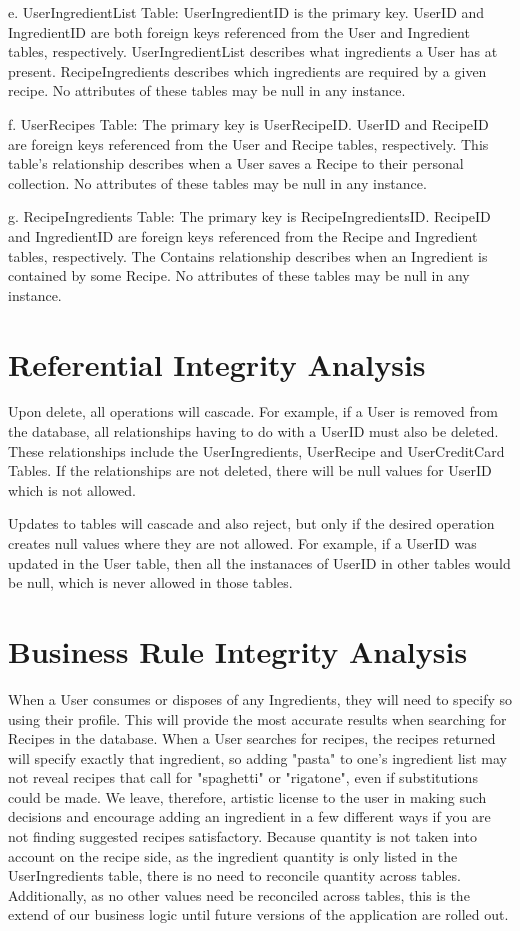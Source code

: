 \documentclass{article}
\begin{document}
e.	UserIngredientList Table: UserIngredientID is the primary key. UserID and IngredientID are both foreign keys referenced from the User and Ingredient tables, respectively.  UserIngredientList describes what ingredients a User has at present. RecipeIngredients describes which ingredients are required by a given recipe. No attributes of these tables may be null in any instance.

f.	UserRecipes Table: The primary key is UserRecipeID. UserID and RecipeID are foreign keys referenced from the User and Recipe tables, respectively. This table's relationship describes when a User saves a Recipe to their personal collection. No attributes of these tables may be null in any instance.
 
g.	RecipeIngredients Table:  The primary key is RecipeIngredientsID. RecipeID and IngredientID are foreign keys referenced from the Recipe and Ingredient tables, respectively. The Contains relationship describes when an Ingredient is contained by some Recipe. No attributes of these tables may be null in any instance.

\section{Referential Integrity Analysis}
Upon delete, all operations will cascade. For example, if a User is removed from the database, all relationships having to do with a UserID must also be deleted. These relationships include the UserIngredients, UserRecipe and UserCreditCard Tables. If the relationships are not deleted, there will be null values for UserID which is not allowed.

Updates to tables will cascade and also reject, but only if the desired operation creates null values where they are not allowed. For example, if a UserID was updated in the User table, then all the instanaces of UserID in other tables would be null, which is never allowed in those tables.

\section{Business Rule Integrity Analysis}
	When a User consumes or disposes of any Ingredients, they will need to specify so using their profile. This will provide the most accurate results when searching for Recipes in the database.
	When a User searches for recipes, the recipes returned will specify exactly that ingredient, so adding "pasta" to one's ingredient list may not reveal recipes that call for "spaghetti" or "rigatone", even if substitutions could be made. We leave, therefore, artistic license to the user in making such decisions and encourage adding an ingredient in a few different ways if you are not finding suggested recipes satisfactory.
	Because quantity is not taken into account on the recipe side, as the ingredient quantity is only listed in the UserIngredients table, there is no need to reconcile quantity across tables. Additionally, as no other values need be reconciled across tables, this is the extend of our business logic until future versions of the application are rolled out.
\newpage
{}
 
 

 
\end{document}
